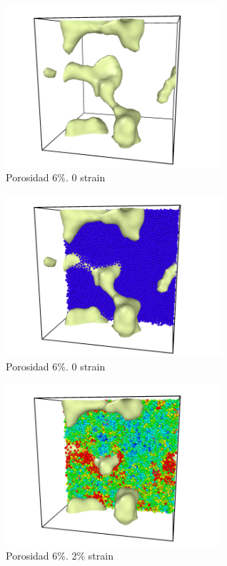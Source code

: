 \documentclass[10pt, oneside]{article} %
\begin{document}
\begin{figure}[H]
\centering
\includegraphics[width=8cm]{Figures/Porosidad/9_0strain.png}
\caption{Porosidad 6\%. 0 strain}
\end{figure}

\begin{figure}[H]
\centering
\includegraphics[width=8cm]{Figures/Porosidad/9_0strain_color.png}
\caption{Porosidad 6\%. 0 strain}
\end{figure}

\begin{figure}[H]
\centering
\includegraphics[width=8cm]{Figures/Porosidad/9_2strain_color.png}
\caption{Porosidad 6\%. 2\% strain}
\end{figure}
\end{document}
